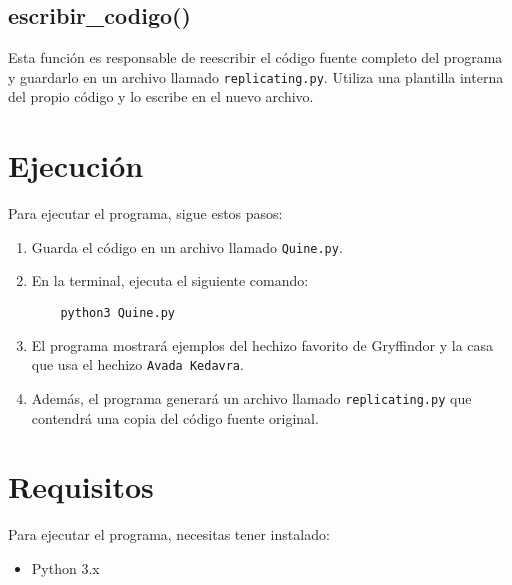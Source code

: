 \documentclass{article}
\begin{document}
\subsection{escribir\_codigo()}
Esta función es responsable de reescribir el código fuente completo del programa y guardarlo en un archivo llamado \texttt{replicating.py}. Utiliza una plantilla interna del propio código y lo escribe en el nuevo archivo.

\section{Ejecución}
Para ejecutar el programa, sigue estos pasos:
\begin{enumerate}
    \item Guarda el código en un archivo llamado \texttt{Quine.py}.
    \item En la terminal, ejecuta el siguiente comando:
    \begin{verbatim}
    python3 Quine.py
    \end{verbatim}
    \item El programa mostrará ejemplos del hechizo favorito de Gryffindor y la casa que usa el hechizo \texttt{Avada Kedavra}.
    \item Además, el programa generará un archivo llamado \texttt{replicating.py} que contendrá una copia del código fuente original.
\end{enumerate}

\section{Requisitos}
Para ejecutar el programa, necesitas tener instalado:
\begin{itemize}
    \item Python 3.x
\end{itemize}
\end{document}
